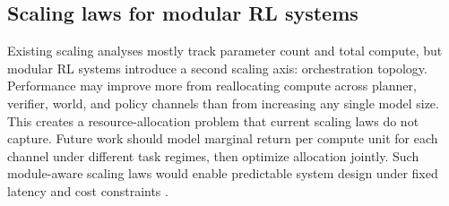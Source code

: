 \documentclass[pdflatex,sn-mathphys-num]{sn-jnl}
\begin{document}
\subsection{Scaling laws for modular RL systems}
Existing scaling analyses mostly track parameter count and total compute, but modular RL systems introduce a second scaling axis: orchestration topology. Performance may improve more from reallocating compute across planner, verifier, world, and policy channels than from increasing any single model size. This creates a resource-allocation problem that current scaling laws do not capture. Future work should model marginal return per compute unit for each channel under different task regimes, then optimize allocation jointly. Such module-aware scaling laws would enable predictable system design under fixed latency and cost constraints \cite{arxiv_p_2510_06727,arxiv_p_2601_11658,arxiv_p_2509_02547,arxiv_p_2602_10576}.
\end{document}
